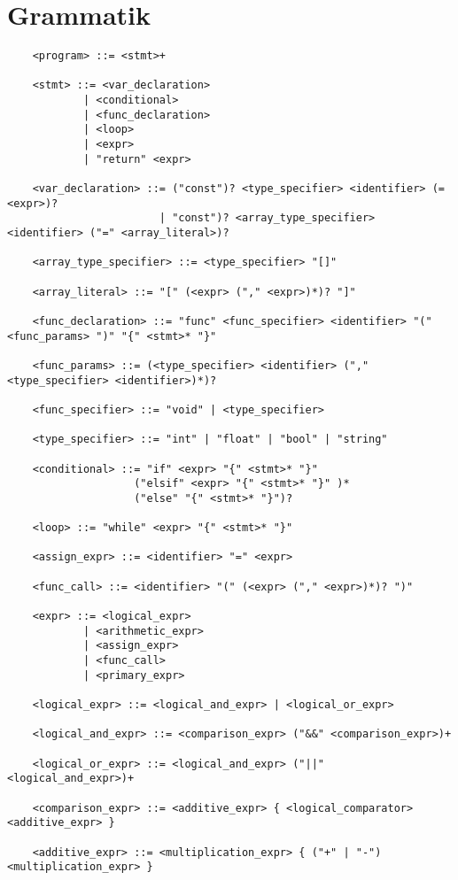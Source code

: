 \documentclass{TDP003mall}
\begin{document}
    \section{Grammatik}
    \begin{verbatim}
    <program> ::= <stmt>+

    <stmt> ::= <var_declaration> 
            | <conditional>
            | <func_declaration>
            | <loop>
            | <expr>
            | "return" <expr>

    <var_declaration> ::= ("const")? <type_specifier> <identifier> (= <expr>)?
                        | "const")? <array_type_specifier> <identifier> ("=" <array_literal>)?

    <array_type_specifier> ::= <type_specifier> "[]"

    <array_literal> ::= "[" (<expr> ("," <expr>)*)? "]"

    <func_declaration> ::= "func" <func_specifier> <identifier> "(" <func_params> ")" "{" <stmt>* "}"

    <func_params> ::= (<type_specifier> <identifier> ("," <type_specifier> <identifier>)*)? 

    <func_specifier> ::= "void" | <type_specifier>

    <type_specifier> ::= "int" | "float" | "bool" | "string"

    <conditional> ::= "if" <expr> "{" <stmt>* "}"
                    ("elsif" <expr> "{" <stmt>* "}" )*
                    ("else" "{" <stmt>* "}")?

    <loop> ::= "while" <expr> "{" <stmt>* "}"

    <assign_expr> ::= <identifier> "=" <expr>

    <func_call> ::= <identifier> "(" (<expr> ("," <expr>)*)? ")"

    <expr> ::= <logical_expr> 
            | <arithmetic_expr> 
            | <assign_expr>
            | <func_call>
            | <primary_expr>

    <logical_expr> ::= <logical_and_expr> | <logical_or_expr>

    <logical_and_expr> ::= <comparison_expr> ("&&" <comparison_expr>)+

    <logical_or_expr> ::= <logical_and_expr> ("||" <logical_and_expr>)+

    <comparison_expr> ::= <additive_expr> { <logical_comparator> <additive_expr> }

    <additive_expr> ::= <multiplication_expr> { ("+" | "-") <multiplication_expr> }


\end{verbatim}
\end{document}
